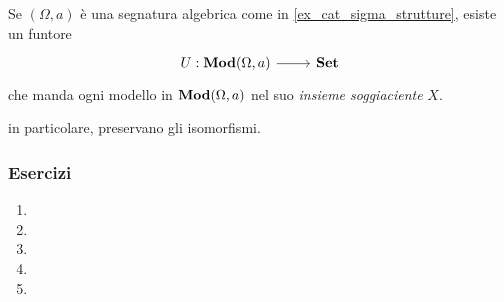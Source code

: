 \begin{example}\label{exa_funtori_liberi_forgetti}
	Se \((\Omega,a)\) è una segnatura algebrica come in \ref{ex_cat_sigma_strutture}, esiste un funtore
	\[
		\begin{tikzcd}
			U : \ctMod(\Omega,a) \ar[r] & \ctSet
		\end{tikzcd}
	\]
	che manda ogni modello in \(\mathbf{Mod}(\Omega,a)\) nel suo \emph{insieme soggiaciente} \(X\).
\end{example}
\begin{proposition}\label{compo_funtori}
\end{proposition}
\begin{definition}\label{def_funtore_id}
\end{definition}
\begin{definition}\label{ex_cat_cat}
\end{definition}
\begin{definition}\label{def_diagramma_comm}
\end{definition}
\begin{lemma}\label{lem_funtori_preservano_comm}
	 in particolare, preservano gli isomorfismi.
\end{lemma}
\begin{definition}\label{def_cat_cocomma}
\end{definition}


\subsubsection*{Esercizi}
\begin{enumerate}
	\item
	\item
	\item
	\item
	\item
\end{enumerate}

